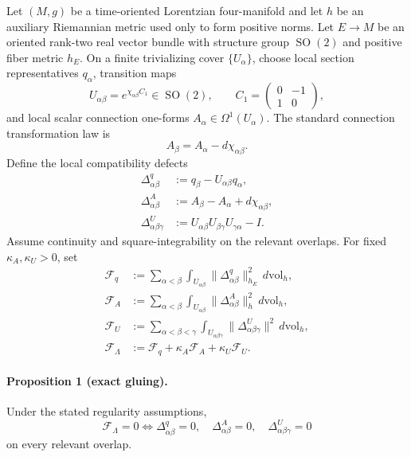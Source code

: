 \documentclass[aps,prd,reprint,nofootinbib,superscriptaddress]{revtex4-2}
\newcommand{\SO}{\operatorname{SO}}
\begin{document}
Let $(M,g)$ be a time-oriented Lorentzian four-manifold and let $h$ be an auxiliary Riemannian metric used only to form positive norms. Let $E\to M$ be an oriented rank-two real vector bundle with structure group $\SO(2)$ and positive fiber metric $h_E$. On a finite trivializing cover $\{U_\alpha\}$, choose local section representatives $q_\alpha$, transition maps
\begin{equation}
U_{\alpha\beta}=e^{\chi_{\alpha\beta}C_1}\in\SO(2),
\qquad
C_1=
\begin{pmatrix}
0&-1\\
1&0
\end{pmatrix},
\label{eq:transitions}
\end{equation}
and local scalar connection one-forms $A_\alpha\in\Omega^1(U_\alpha)$. The standard connection transformation law is
\begin{equation}
A_\beta=A_\alpha-d\chi_{\alpha\beta}.
\label{eq:connlaw}
\end{equation}
Define the local compatibility defects
\begin{align}
\Delta^q_{\alpha\beta}
&:=q_\beta-U_{\alpha\beta}q_\alpha,
\\
\Delta^A_{\alpha\beta}
&:=A_\beta-A_\alpha+d\chi_{\alpha\beta},
\\
\Delta^U_{\alpha\beta\gamma}
&:=U_{\alpha\beta}U_{\beta\gamma}U_{\gamma\alpha}-I.
\label{eq:defects}
\end{align}
Assume continuity and square-integrability on the relevant overlaps. For fixed $\kappa_A,\kappa_U>0$, set
\begin{align}
\mathcal F_q
&:=\sum_{\alpha<\beta}\int_{U_{\alpha\beta}}
\|\Delta^q_{\alpha\beta}\|_{h_E}^2\,d\mathrm{vol}_h,
\\
\mathcal F_A
&:=\sum_{\alpha<\beta}\int_{U_{\alpha\beta}}
\|\Delta^A_{\alpha\beta}\|_{h}^2\,d\mathrm{vol}_h,
\\
\mathcal F_U
&:=\sum_{\alpha<\beta<\gamma}\int_{U_{\alpha\beta\gamma}}
\|\Delta^U_{\alpha\beta\gamma}\|^2\,d\mathrm{vol}_h,
\\
\mathcal F_{\Lambda}
&:=\mathcal F_q+\kappa_A\mathcal F_A+\kappa_U\mathcal F_U.
\label{eq:functional}
\end{align}

\paragraph{Proposition 1 (exact gluing).}
Under the stated regularity assumptions,
\begin{equation}
\boxed{
\mathcal F_{\Lambda}=0
\iff
\Delta^q_{\alpha\beta}=0,
\quad
\Delta^A_{\alpha\beta}=0,
\quad
\Delta^U_{\alpha\beta\gamma}=0
}
\label{eq:zero}
\end{equation}
on every relevant overlap.
\end{document}
